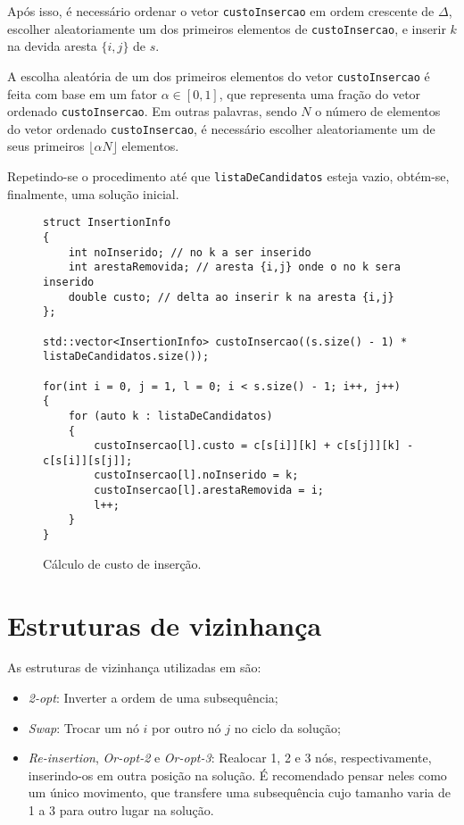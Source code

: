Após isso, é necessário ordenar o vetor \texttt{custoInsercao} em ordem crescente de \(\Delta\), escolher aleatoriamente um dos primeiros elementos de \texttt{custoInsercao}, e inserir \(k\) na devida aresta \(\{i,j\}\) de \(s\).

A escolha aleatória de um dos primeiros elementos do vetor \linebreak \texttt{custoInsercao} é feita com base em um fator \(\alpha \in [0,1]\), que representa uma fração do vetor ordenado \texttt{custoInsercao}. Em outras palavras, sendo \(N\) o número de elementos do vetor ordenado \texttt{custoInsercao}, é necessário escolher aleatoriamente um de seus primeiros \(\lfloor{\alpha N}\rfloor\) elementos.

Repetindo-se o procedimento até que \texttt{listaDeCandidatos} esteja vazio, obtém-se, finalmente, uma solução inicial.

\begin{figure}[!htbp]
    \centering
    \begin{lstlisting}
struct InsertionInfo
{
    int noInserido; // no k a ser inserido
    int arestaRemovida; // aresta {i,j} onde o no k sera inserido
    double custo; // delta ao inserir k na aresta {i,j}
};
    
std::vector<InsertionInfo> custoInsercao((s.size() - 1) * listaDeCandidatos.size());

for(int i = 0, j = 1, l = 0; i < s.size() - 1; i++, j++)
{
    for (auto k : listaDeCandidatos)
    {
        custoInsercao[l].custo = c[s[i]][k] + c[s[j]][k] - c[s[i]][s[j]];
        custoInsercao[l].noInserido = k;
        custoInsercao[l].arestaRemovida = i;
        l++;
    }
}
    \end{lstlisting}
    \caption{Cálculo de custo de inserção.}
    \label{fig:5}
\end{figure}

\section{Estruturas de vizinhança}
As estruturas de vizinhança utilizadas em \cite{SILVA2012513} são: 
\begin{itemize}
    \item \textit{2-opt}: Inverter a ordem de uma subsequência;
    \item \textit{Swap}: Trocar um nó \(i\) por outro nó \(j\) no ciclo da solução;
    \item\textit{ Re-insertion}, \textit{Or-opt-2} e \textit{Or-opt-3}: Realocar 1, 2 e 3 nós, respectivamente, inserindo-os em outra posição na solução. É recomendado pensar neles como um único movimento, que transfere uma subsequência cujo tamanho varia de 1 a 3 para outro lugar na solução.
    
\end{itemize}

